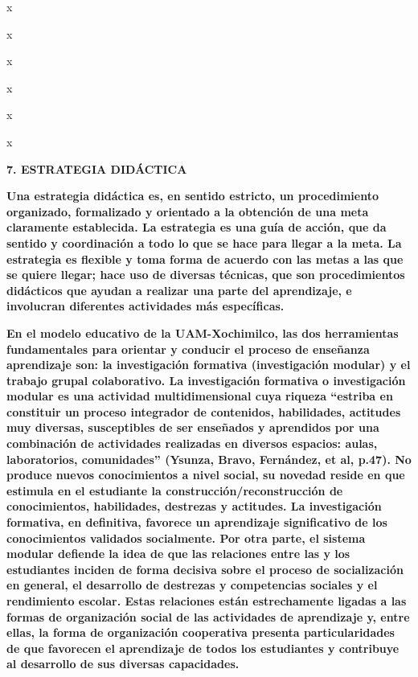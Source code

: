 \documentclass[
]{article}
\begin{document}
x

x

x

x

x

x

\textbf{7. ESTRATEGIA DIDÁCTICA}

\textbf{Una estrategia didáctica es, en sentido estricto, un
procedimiento organizado, formalizado y orientado a la obtención de una
meta claramente establecida. La estrategia es una guía de acción, que da
sentido y coordinación a todo lo que se hace para llegar a la meta. La
estrategia es flexible y toma forma de acuerdo con las metas a las que
se quiere llegar; hace uso de diversas técnicas, que son procedimientos
didácticos que ayudan a realizar una parte del aprendizaje, e involucran
diferentes actividades más específicas.}

\textbf{En el modelo educativo de la UAM-Xochimilco, las dos
herramientas fundamentales para orientar y conducir el proceso de
enseñanza aprendizaje son: la investigación formativa (investigación
modular) y el trabajo grupal colaborativo. La investigación formativa o
investigación modular es una actividad multidimensional cuya riqueza
``estriba en constituir un proceso integrador de contenidos,
habilidades, actitudes muy diversas, susceptibles de ser enseñados y
aprendidos por una combinación de actividades realizadas en diversos
espacios: aulas, laboratorios, comunidades'' (Ysunza, Bravo, Fernández,
et al, p.47). No produce nuevos conocimientos a nivel social, su novedad
reside en que estimula en el estudiante la construcción/reconstrucción
de conocimientos, habilidades, destrezas y actitudes. La investigación
formativa, en definitiva, favorece un aprendizaje significativo de los
conocimientos validados socialmente. Por otra parte, el sistema modular
defiende la idea de que las relaciones entre las y los estudiantes
inciden de forma decisiva sobre el proceso de socialización en general,
el desarrollo de destrezas y competencias sociales y el rendimiento
escolar. Estas relaciones están estrechamente ligadas a las formas de
organización social de las actividades de aprendizaje y, entre ellas, la
forma de organización cooperativa presenta particularidades de que
favorecen el aprendizaje de todos los estudiantes y contribuye al
desarrollo de sus diversas capacidades.}
\end{document}
